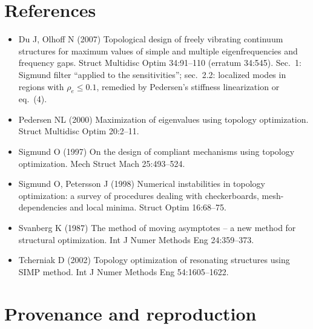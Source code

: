 \documentclass[10pt,a4paper]{article}
\begin{document}
\section*{References}
{\small
\begin{itemize}
\item Du J, Olhoff N (2007) Topological design of freely vibrating continuum structures for maximum values of simple and multiple eigenfrequencies and frequency gaps. Struct Multidisc Optim 34:91--110 (erratum 34:545). Sec.~1: Sigmund filter ``applied to the sensitivities''; sec.~2.2: localized modes in regions with $\rho_e\le0.1$, remedied by Pedersen's stiffness linearization or eq.~(4).
\item Pedersen NL (2000) Maximization of eigenvalues using topology optimization. Struct Multidisc Optim 20:2--11.
\item Sigmund O (1997) On the design of compliant mechanisms using topology optimization. Mech Struct Mach 25:493--524.
\item Sigmund O, Petersson J (1998) Numerical instabilities in topology optimization: a survey of procedures dealing with checkerboards, mesh-dependencies and local minima. Struct Optim 16:68--75.
\item Svanberg K (1987) The method of moving asymptotes -- a new method for structural optimization. Int J Numer Methods Eng 24:359--373.
\item Tcherniak D (2002) Topology optimization of resonating structures using SIMP method. Int J Numer Methods Eng 54:1605--1622.
\end{itemize}}

\appendix
\section{Provenance and reproduction}\label{app:prov}
\end{document}
